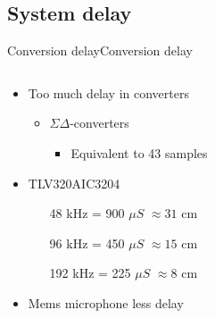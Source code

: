 \subsection{System delay}
\begin{frame}{Conversion delay}{Conversion delay}
	\begin{columns}
		\begin{column}{0.4\textwidth}
		\begin{itemize}
		\item Too much delay in converters
				\begin{itemize}
				\item $\Sigma \Delta$-converters
				\begin{itemize}
				\item Equivalent to 43 samples
				\end{itemize}								
				\end{itemize}
		\item TLV320AIC3204
				\begin{itemize}
				\item[\textcolor{MATLABred}{48 kHz}]= 900 $\mu S$ $\approx 31$ cm
				\item[\textcolor{MATLAByellow}{96 kHz}]= 450 $\mu S$ $\approx 15$ cm
				\item[\textcolor{MATLABpurple}{192 kHz}]= 225 $\mu S$ $\approx 8$ cm
				\end{itemize}	
				\item Mems 	microphone less delay	 
		\end{itemize}
		\end{column}
		\begin{column}{0.6\textwidth} 
		\begin{center}
		
		\end{center}
		\end{column}
	\end{columns}
\end{frame}

